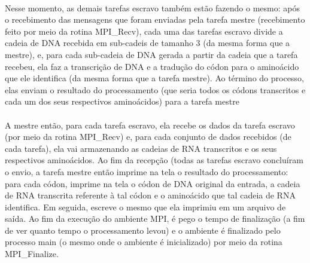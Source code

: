 \documentclass[a4paper,10pt]{article}
\begin{document}
\paragraph{}Nesse momento, as demais tarefas escravo também estão fazendo o mesmo: após o recebimento das mensagens que foram enviadas pela tarefa mestre (recebimento feito por meio da rotina MPI\_Recv), cada uma das tarefas escravo divide a cadeia de DNA recebida em sub-cadeis de tamanho 3 (da mesma forma que a mestre), e, para cada sub-cadeia de DNA gerada a partir da cadeia que a tarefa recebeu, ela faz a transcrição de DNA e a tradução do códon para o aminoácido que ele identifica (da mesma forma que a tarefa mestre). Ao término do processo, elas enviam o resultado do processamento (que seria todos os códons transcritos e cada um dos seus respectivos aminoácidos) para a tarefa mestre\\
\paragraph{} A mestre então, para cada tarefa escravo, ela recebe os dados da tarefa escravo (por meio da rotina MPI\_Recv) e, para cada conjunto de dados recebidos (de cada tarefa), ela vai armazenando as cadeias de RNA transcritos e os seus respectivos aminoácidos. Ao fim da recepção (todas as tarefas escravo concluíram o envio, a tarefa mestre então imprime na tela o resultado do processamento: para cada códon, imprime na tela o códon de DNA original da entrada, a cadeia de RNA transcrita referente à tal códon e o aminoácido que tal cadeia de RNA identifica. Em seguida, escreve o mesmo que ela imprimiu em um arquivo de saída. Ao fim da execução do ambiente MPI, é pego o tempo de finalização (a fim de ver quanto tempo o processamento levou) e o ambiente é finalizado pelo processo main (o mesmo onde o ambiente é inicializado) por meio da rotina MPI\_Finalize.\\
\end{document}
